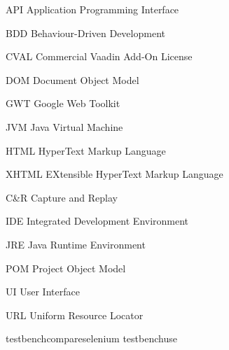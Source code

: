 \documentclass[12pt,a4paper,english%
]{tutthesis}
\begin{document}
\begin{termlist}
\item [API] Application Programming Interface
\item [BDD] Behaviour-Driven Development
\item [CVAL] Commercial Vaadin Add-On License
\item [DOM] Document Object Model
\item [GWT] Google Web Toolkit
\item [JVM] Java Virtual Machine
\item [HTML] HyperText Markup Language
\item [XHTML] EXtensible HyperText Markup Language
\item [C\&R]Capture and Replay
\item [IDE] Integrated Development Environment
\item [JRE] Java Runtime Environment
\item [POM] Project Object Model
\item [UI] User Interface
\item [URL] Uniform Resource Locator

\end{termlist} 


\cleardoublepage

\newpage             %
\setcounter{page}{1} %
\renewcommand{\chaptername}{} %




 




 {testbenchcompareselenium}
 {testbenchuse}  

\iffalse
\end{document}
